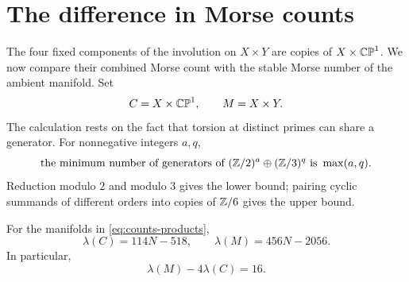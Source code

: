 \section{The difference in Morse counts}\label{sec:counts}

The four fixed components of the involution on $X\times Y$ are copies
of $X\times\mathbb{CP}^1$.  We now compare their combined Morse count with the
stable Morse number of the ambient manifold.  Set
\begin{equation}\label{eq:counts-products}
 C=X\times\mathbb{CP}^1,\qquad M=X\times Y.
\end{equation}
The calculation rests on the fact that torsion at distinct primes can
share a generator.  For nonnegative integers $a,q$,
\begin{equation}\label{eq:counts-generators}
 \text{the minimum number of generators of }
 (\mathbb Z/2)^a\oplus(\mathbb Z/3)^q
 \text{ is }\max(a,q).
\end{equation}
Reduction modulo $2$ and modulo $3$ gives the lower bound; pairing
cyclic summands of different orders into copies of $\mathbb Z/6$ gives the
upper bound.

\begin{proposition}\label{prop:gap}
For the manifolds in \eqref{eq:counts-products},
\begin{equation}\label{eq:counts-values}
 \lambda(C)=114N-518,\qquad
 \lambda(M)=456N-2056.
\end{equation}
In particular,
\begin{equation}\label{eq:counts-gap}
 \lambda(M)-4\lambda(C)=16.
\end{equation}
\end{proposition}

